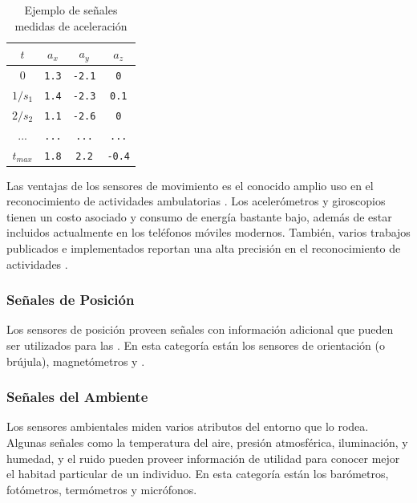 \begin{table}[!tbph]
\begin{centering}
\begin{tabular}{|c|c|c|c|}
\hline 
$t$ & $a_{x}$ & $a_{y}$ & $a_{z}$\tabularnewline
\hline 
\hline 
$0$ & \texttt{1.3} & \texttt{-2.1} & \texttt{0}\tabularnewline
\hline 
$1/s_{1}$ & \texttt{1.4} & \texttt{-2.3} & \texttt{0.1}\tabularnewline
\hline 
$2/s_{2}$ & \texttt{1.1} & \texttt{-2.6} & \texttt{0}\tabularnewline
\hline 
... & \texttt{...} & \texttt{...} & \texttt{...}\tabularnewline
\hline 
$t_{max}$ & \texttt{1.8} & \texttt{2.2} & \texttt{-0.4}\tabularnewline
\hline 
\end{tabular}
\par\end{centering}
\caption[Ejemplo de señales medidas de aceleración]{\label{tab421:ex-signal}Ejemplo de señales medidas de aceleración}
\end{table}

Las ventajas de los sensores de movimiento es el conocido amplio uso
en el reconocimiento de actividades ambulatorias \cite{Bao2004,Kwapisz2011,ReyesOrtiz2015}.
Los acelerómetros y giroscopios tienen un costo asociado y consumo
de energía bastante bajo, además de estar incluidos actualmente en
los teléfonos móviles modernos. También, varios trabajos publicados
e implementados reportan una alta precisión en el reconocimiento de
actividades \cite{Bao2004,LaraLabrador2012}.

\subsubsection{Señales de Posición}

Los sensores de posición proveen señales con información adicional
que pueden ser utilizados para las . En esta categoría
están los sensores de orientación (o brújula), magnetómetros y . 

\subsubsection{Señales del Ambiente}

Los sensores ambientales miden varios atributos del entorno que lo
rodea. Algunas señales como la temperatura del aire, presión atmosférica,
iluminación, y humedad, y el ruido pueden proveer información de utilidad
para conocer mejor el habitad particular de un individuo. En esta
categoría están los barómetros, fotómetros, termómetros y micrófonos.

